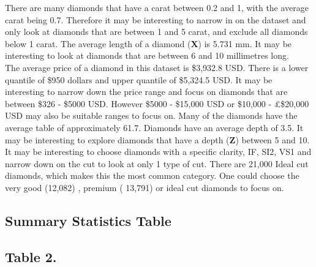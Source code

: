 \documentclass[
]{article}
\begin{document}
There are many diamonds that have a carat between 0.2 and 1, with the
average carat being 0.7. Therefore it may be interesting to narrow in on
the dataset and only look at diamonds that are between 1 and 5 carat,
and exclude all diamonds below 1 carat. The average length of a diamond
(\textbf{X}) is 5.731 mm. It may be interesting to look at diamonds that
are between 6 and 10 millimetres long.\\
The average price of a diamond in this dataset is \$3,932.8 USD. There
is a lower quantile of \$950 dollars and upper quantile of \$5,324.5
USD. It may be interesting to narrow down the price range and focus on
diamonds that are between \$326 - \$5000 USD. However \$5000 - \$15,000
USD or \$10,000 - £\$20,000 USD may also be suitable ranges to focus on.
Many of the diamonds have the average table of approximately 61.7.
Diamonds have an average depth of 3.5. It may be interesting to explore
diamonds that have a depth (\textbf{Z}) between 5 and 10. It may be
interesting to choose diamonds with a specific clarity, IF, SI2, VS1 and
narrow down on the cut to look at only 1 type of cut. There are 21,000
Ideal cut diamonds, which makes this the most common category. One could
choose the very good (12,082) , premium ( 13,791) or ideal cut diamonds
to focus on.

\hypertarget{summary-statistics-table}{%
\subsection{Summary Statistics Table}\label{summary-statistics-table}}

\hypertarget{table-2.}{%
\subsection{Table 2.}\label{table-2.}}
\end{document}
